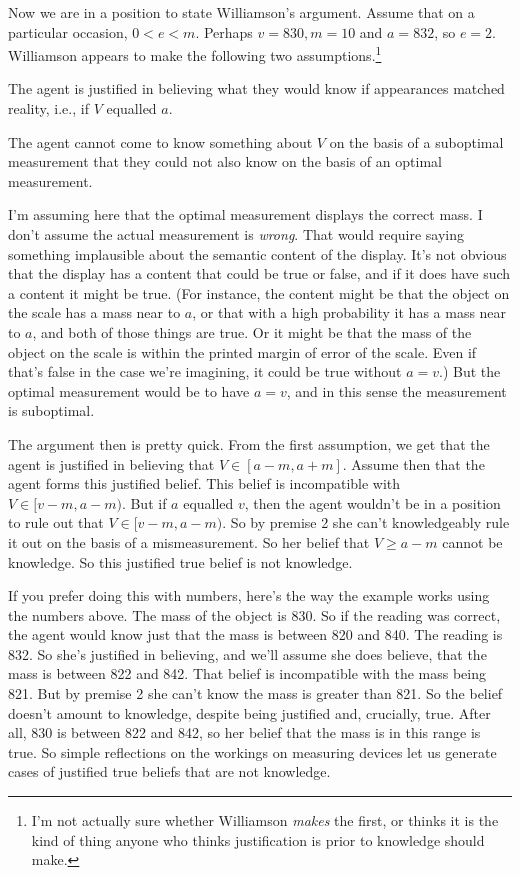 Now we are in a position to state Williamson's argument. Assume that on a particular occasion, $0 < e < m$. Perhaps $v = 830, m =10$ and $a = 832$, so $e = 2$. Williamson appears to make the following two assumptions.\footnote{I'm not actually sure whether Williamson \textit{makes} the first, or thinks it is the kind of thing anyone who thinks justification is prior to knowledge should make.}

\begin{enumerate*}
\item The agent is justified in believing what they would know if appearances matched reality, i.e., if $V$ equalled $a$.
\item The agent cannot come to know something about $V$ on the basis of a suboptimal measurement that they could not also know on the basis of an optimal measurement.
\end{enumerate*}

\noindent I'm assuming here that the optimal measurement displays the correct mass. I don't assume the actual measurement is \textit{wrong}. That would require saying something implausible about the semantic content of the display. It's not obvious that the display has a content that could be true or false, and if it does have such a content it might be true. (For instance, the content might be that the object on the scale has a mass near to $a$, or that with a high probability it has a mass near to $a$, and both of those things are true. Or it might be that the mass of the object on the scale is within the printed margin of error of the scale. Even if that's false in the case we're imagining, it could be true without $a = v$.) But the optimal measurement would be to have $a = v$, and in this sense the measurement is suboptimal.

The argument then is pretty quick. From the first assumption, we get that the agent is justified in believing that $V \in [a - m, a + m]$. Assume then that the agent forms this justified belief. This belief is incompatible with $V \in [v - m, a - m)$. But if $a$ equalled $v$, then the agent wouldn't be in a position to rule out that $V \in [v - m, a - m)$. So by premise 2 she can't knowledgeably rule it out on the basis of a mismeasurement. So her belief that $V \geq a - m$ cannot be knowledge. So this justified true belief is not knowledge.

If you prefer doing this with numbers, here's the way the example works using the numbers above. The mass of the object is 830. So if the reading was correct, the agent would know just that the mass is between 820 and 840. The reading is 832. So she's justified in believing, and we'll assume she does believe, that the mass is between 822 and 842. That belief is incompatible with the mass being 821. But by premise 2 she can't know the mass is greater than 821. So the belief doesn't amount to knowledge, despite being justified and, crucially, true. After all, 830 is between 822 and 842, so her belief that the mass is in this range is true. So simple reflections on the workings on measuring devices let us generate cases of justified true beliefs that are not knowledge.

